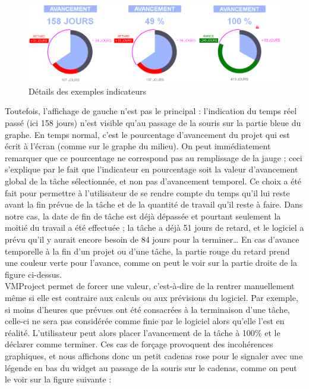 \documentclass[12pt]{report}
\begin{document}
\begin{figure}[H]
	\centering
	\includegraphics[width=1\textwidth]{pictures/clement/c6.png}
	\caption{Détails des exemples indicateurs}
	\label{c6}
\end{figure}

Toutefois, l’affichage de gauche n’est pas le principal : l’indication du temps réel passé (ici 158 jours) n’est visible qu’au passage de la souris sur la partie bleue du graphe. En temps normal, c’est le pourcentage d’avancement du projet qui est écrit à l’écran (comme sur le graphe du milieu). On peut immédiatement remarquer que ce pourcentage ne correspond pas au remplissage de la jauge ; ceci s’explique par le fait que l’indicateur en pourcentage soit la valeur d’avancement global de la tâche sélectionnée, et non pas d’avancement temporel. Ce choix a été fait pour permettre à l’utilisateur de se rendre compte du temps qu’il lui reste avant la fin prévue de la tâche et de la quantité de travail qu’il reste à faire. Dans notre cas, la date de fin de tâche est déjà dépassée et pourtant seulement la moitié du travail a été effectuée ; la tâche a déjà 51 jours de retard, et le logiciel a prévu qu’il y aurait encore besoin de 84 jours pour la terminer…  En cas d’avance temporelle à la fin d’un projet ou d’une tâche, la partie rouge du retard prend une couleur verte pour l’avance, comme on peut le voir sur la partie droite de la figure ci-dessus.\\
VMProject permet de forcer une valeur, c’est-à-dire de la rentrer manuellement même si elle est contraire aux calculs ou aux prévisions du logiciel. Par exemple, si moins d’heures que prévues ont été consacrées à la terminaison d’une tâche, celle-ci ne sera pas considérée comme finie par le logiciel alors qu’elle l’est en réalité. L’utilisateur peut alors placer l’avancement de la tâche à 100\% et le déclarer comme terminer. Ces cas de forçage provoquent des incohérences graphiques, et nous affichons donc un petit cadenas rose pour le signaler avec une légende en bas du widget au passage de la souris sur le cadenas, comme on peut le voir sur la figure suivante :\\
\end{document}
